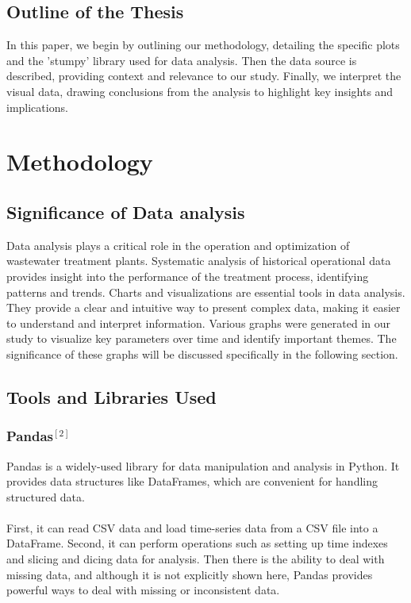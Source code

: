 \documentclass[]{iat}
\begin{document}
\section{Outline of the Thesis}
In this paper, we begin by outlining our methodology, detailing the specific plots and the 'stumpy' library used for data analysis. Then the data source is described, providing context and relevance to our study. Finally, we interpret the visual data, drawing conclusions from the analysis to highlight key insights and implications.
\chapter{Methodology}
\section{Significance of Data analysis}
Data analysis plays a critical role in the operation and optimization of wastewater treatment plants. Systematic analysis of historical operational data provides insight into the performance of the treatment process, identifying patterns and trends. Charts and visualizations are essential tools in data analysis. They provide a clear and intuitive way to present complex data, making it easier to understand and interpret information. Various graphs were generated in our study to visualize key parameters over time and identify important themes. The significance of these graphs will be discussed specifically in the following section.
\section{Tools and Libraries Used}
\subsection{Pandas$^{[2]}$}
Pandas is a widely-used library for data manipulation and analysis in Python. It provides data structures like DataFrames, which are convenient for handling structured data.\\
\\
First, it can read CSV data and load time-series data from a CSV file into a DataFrame. Second, it can perform operations such as setting up time indexes and slicing and dicing data for analysis. Then there is the ability to deal with missing data, and although it is not explicitly shown here, Pandas provides powerful ways to deal with missing or inconsistent data.
\end{document}
